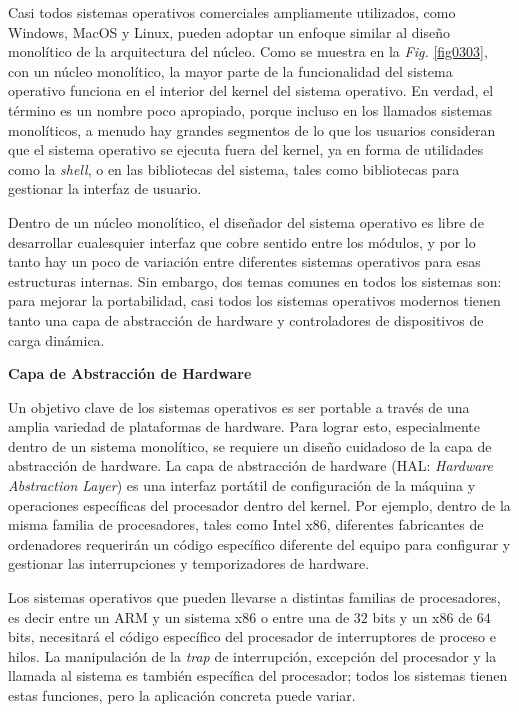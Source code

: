 \documentclass[10pt]{book}
\begin{document}
Casi todos sistemas operativos comerciales ampliamente utilizados, como Windows, MacOS y Linux, pueden adoptar un enfoque similar al diseño monolítico de  la arquitectura del núcleo. Como se muestra en la \textit{Fig.} \ref{fig0303}, con un núcleo monolítico, la mayor parte de la funcionalidad del sistema operativo funciona en el interior del kernel del sistema operativo. En verdad, el término es un nombre poco apropiado, porque incluso en los llamados sistemas monolíticos, a menudo hay grandes segmentos de lo que los usuarios consideran que el sistema operativo se ejecuta fuera del kernel, ya en forma de utilidades como la \textit{shell}, o en las bibliotecas del sistema, tales como bibliotecas para gestionar la interfaz de usuario.

Dentro de un núcleo monolítico, el diseñador del sistema operativo es libre de desarrollar cualesquier interfaz que cobre sentido entre los módulos, y por lo tanto hay un poco de variación entre diferentes sistemas operativos para esas estructuras internas. Sin embargo, dos temas comunes en todos los sistemas son: para mejorar la portabilidad, casi todos los sistemas operativos modernos tienen tanto una capa de abstracción de hardware y controladores de dispositivos de carga dinámica.

\textbf{Capa de Abstracción de Hardware}

Un objetivo clave de los sistemas operativos es ser portable a través de una amplia variedad de plataformas de hardware. Para lograr esto, especialmente dentro de un sistema monolítico, se requiere un diseño cuidadoso de la capa de abstracción de hardware. La capa de abstracción de hardware (HAL: \textit{\textit{Hardware Abstraction Layer}}) es una interfaz portátil de configuración de la máquina y operaciones específicas del procesador dentro del kernel. Por ejemplo, dentro de la misma familia de procesadores, tales como Intel {\mf x86}, diferentes fabricantes de ordenadores requerirán un código específico diferente del equipo para configurar y gestionar las interrupciones y temporizadores de hardware.

Los sistemas operativos que pueden llevarse a distintas familias de procesadores, es decir entre un ARM y un sistema {\mf x86} o entre una de $32$ bits y un {\mf x86} de $64$ bits, necesitará el código específico del procesador de interruptores de proceso e hilos. La manipulación de la \textit{trap} de interrupción, excepción del procesador y la llamada al sistema es también específica del procesador; todos los sistemas tienen estas funciones, pero la aplicación concreta puede variar.
\end{document}

